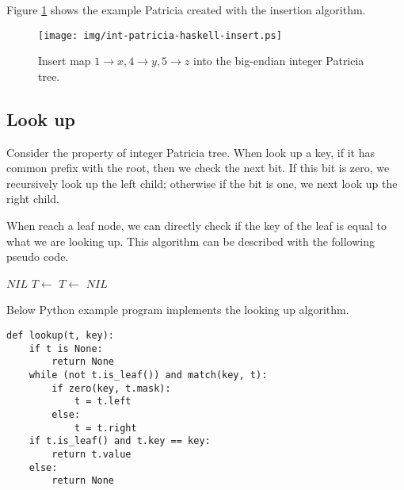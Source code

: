 \documentclass{article}
\begin{document}
Figure \ref{fig:int-patricia-haskell-insert} shows the example Patricia created
with the insertion algorithm.

\begin{figure}[htbp]
  \centering
  \texttt{[image: img/int-patricia-haskell-insert.ps]}
  \caption{Insert map $1 \rightarrow x, 4 \rightarrow y, 5 \rightarrow z$ into the big-endian integer Patricia tree.}
  \label{fig:int-patricia-haskell-insert}
\end{figure}


\subsection{Look up}
Consider the property of integer Patricia tree. When look up a
key, if it has common prefix with the root,
then we check the next bit. If
this bit is zero, we recursively look up the left child;
otherwise if the bit is one, we next look up the right child.

When reach a leaf node, we can directly check if the key of the
leaf is equal to what we are looking up. This algorithm can be
described with the following pseudo code.

\begin{algorithmic}[1]
    \State \Return $NIL$ 
  \EndIf
      \State $T \gets$ 
    \Else
      \State $T \gets$ 
    \EndIf
  \EndWhile
    \State \Return {}
  \Else
    \State \Return $NIL$ 
  \EndIf
\EndFunction
\end{algorithmic}

Below Python example program implements the looking up algorithm.

\lstset{language=Python}
\begin{lstlisting}
def lookup(t, key):
    if t is None:
        return None
    while (not t.is_leaf()) and match(key, t):
        if zero(key, t.mask):
            t = t.left
        else:
            t = t.right
    if t.is_leaf() and t.key == key:
        return t.value
    else:
        return None
\end{lstlisting}
\end{document}

